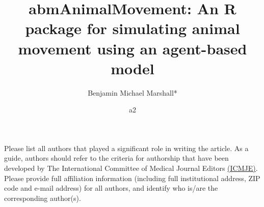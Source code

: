 \documentclass[10pt,a4paper]{article}
\begin{document}
\pagestyle{fancy}

\title{abmAnimalMovement: An R package for simulating animal movement using an agent-based model}
\author[1]{Benjamin Michael Marshall*}
\author[2]{a2}


\maketitle
\thispagestyle{fancy}

Please list all authors that played a significant role in writing the article. As a guide, authors should refer to the criteria for authorship that have been developed by The International Committee of Medical Journal Editors \href{http://www.icmje.org/recommendations/browse/roles-and-responsibilities/defining-the-role-of-authors-and-contributors.html}{(ICMJE)}. Please provide full affiliation information (including full institutional address, ZIP code and e-mail address) for all authors, and identify who is/are the corresponding author(s).
\\
\\
\end{document}
